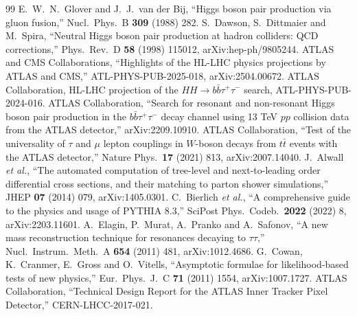 \documentclass[paper=a4,fontsize=10pt,jafontsize=10pt,line_length=44zw,number_of_lines=46]{jlreq}
\begin{document}
\begin{thebibliography}{99}
 E.~W.~N.~Glover and J.~J.~van der Bij, ``Higgs boson pair production via gluon fusion,'' Nucl.\ Phys.\ B \textbf{309} (1988) 282.
 S.~Dawson, S.~Dittmaier and M.~Spira, ``Neutral Higgs boson pair production at hadron colliders: QCD corrections,'' Phys.\ Rev.\ D \textbf{58} (1998) 115012, arXiv:hep-ph/9805244.
 ATLAS and CMS Collaborations, ``Highlights of the HL-LHC physics projections by ATLAS and CMS,'' ATL-PHYS-PUB-2025-018, arXiv:2504.00672.
 ATLAS Collaboration, HL-LHC projection of the $HH\to b\bar b\tau^+\tau^-$ search, ATL-PHYS-PUB-2024-016.
 ATLAS Collaboration, ``Search for resonant and non-resonant Higgs boson pair production in the $b\bar b\tau^+\tau^-$ decay channel using 13 TeV $pp$ collision data from the ATLAS detector,'' arXiv:2209.10910.
 ATLAS Collaboration, ``Test of the universality of $\tau$ and $\mu$ lepton couplings in $W$-boson decays from $t\bar t$ events with the ATLAS detector,'' Nature Phys.\ \textbf{17} (2021) 813, arXiv:2007.14040.
 J.~Alwall \textit{et al.}, ``The automated computation of tree-level and next-to-leading order differential cross sections, and their matching to parton shower simulations,'' JHEP \textbf{07} (2014) 079, arXiv:1405.0301.
 C.~Bierlich \textit{et al.}, ``A comprehensive guide to the physics and usage of PYTHIA 8.3,'' SciPost Phys.\ Codeb.\ \textbf{2022} (2022) 8, arXiv:2203.11601.
 A.~Elagin, P.~Murat, A.~Pranko and A.~Safonov, ``A new mass reconstruction technique for resonances decaying to $\tau\tau$,'' Nucl.\ Instrum.\ Meth.\ A \textbf{654} (2011) 481, arXiv:1012.4686.
 G.~Cowan, K.~Cranmer, E.~Gross and O.~Vitells, ``Asymptotic formulae for likelihood-based tests of new physics,'' Eur.\ Phys.\ J.\ C \textbf{71} (2011) 1554, arXiv:1007.1727.
 ATLAS Collaboration, ``Technical Design Report for the ATLAS Inner Tracker Pixel Detector,'' CERN-LHCC-2017-021.
\end{thebibliography}
\end{document}
